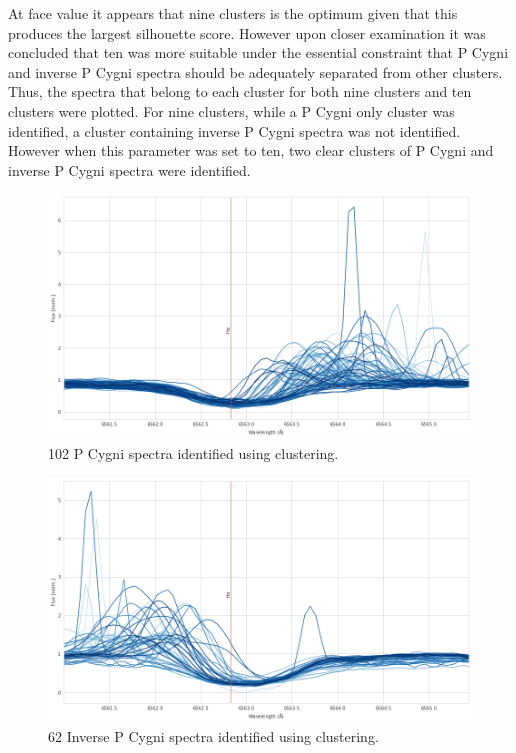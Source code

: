 At face value it appears that nine clusters is the optimum given that this produces the largest silhouette score. However upon closer examination it was concluded that ten was more suitable under the essential constraint that P Cygni and inverse P Cygni spectra should be adequately separated from other clusters. Thus, the spectra that belong to each cluster for both nine clusters and ten clusters were plotted. For nine clusters, while a P Cygni only cluster was identified, a cluster containing inverse P Cygni spectra was not identified. However when this parameter was set to ten, two clear clusters of P Cygni and inverse P Cygni spectra were identified.

\begin{figure}[!htb]
\centering
\includegraphics[scale=0.45]{figures/pcygni.png}
\caption{102 P Cygni spectra identified using clustering.}
\end{figure}

\begin{figure}[!htb]
\centering
\includegraphics[scale=0.45]{figures/inverse p cygni.png}
\caption{62 Inverse P Cygni spectra identified using clustering.}
\end{figure}

